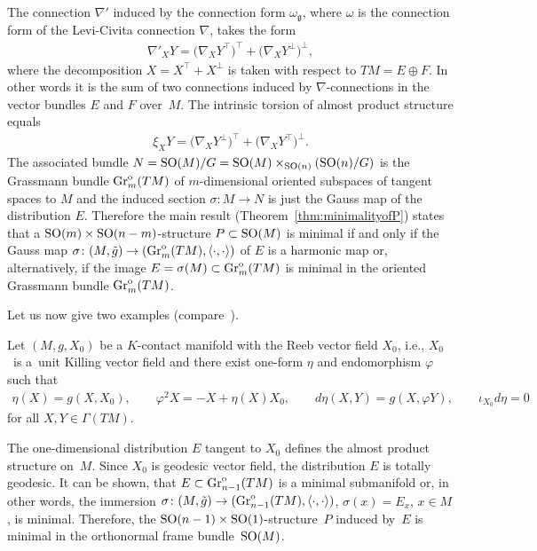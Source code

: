 \documentclass[10pt,a4paper]{amsart}
\numberwithin{equation}{section}
\newcommand{\skal}[2]{\langle #1,#2\rangle}
\begin{document}
The connection $\nabla'$ induced by the connection form $\omega_{\mathfrak{g}}$, where $\omega$ is the connection form of the Levi-Civita connection $\nabla$, takes the form
\begin{gather*}
\nabla '_XY=\big(\nabla_XY^{\top}\big)^{\top}+\big(\nabla_XY^{\bot}\big)^{\bot},
\end{gather*}
where the decomposition $X=X^{\top}+X^{\bot}$ is taken with respect to $TM=E\oplus F$. In other words it is the sum of two connections induced by $\nabla$-connections in the vector bundles $E$ and $F$ over~$M$. The intrinsic torsion of almost product structure equals
\begin{gather*}
\xi_XY=\big(\nabla_XY^{\bot}\big)^{\top}+\big(\nabla_XY^{\top}\big)^{\bot}.
\end{gather*}
The associated bundle $N={\rm SO}(M)/G={\rm SO}(M)\times_{{\rm SO}(n)}({\rm SO}(n)/G)$ is the Grassmann bundle $\operatorname{Gr}^{\rm o}_m(TM)$ of $m$-dimensional oriented subspaces of tangent spaces to $M$ and the induced section $\sigma\colon M\to N$ is just the Gauss map of the distribution $E$. Therefore the main result (Theorem~\ref{thm:minimalityofP}) states that a ${\rm SO}(m)\times {\rm SO}(n-m)$-structure $P\subset {\rm SO}(M)$ is minimal if and only if the Gauss map $\sigma\colon (M,\tilde{g})\to (\operatorname{Gr}^{\rm o}_m(TM),\skal{\cdot}{\cdot})$ of $E$ is a harmonic map or, alternatively, if the image $E=\sigma(M)\subset \operatorname{Gr}^{\rm o}_m(TM)$ is minimal in the oriented Grassmann bundle $\operatorname{Gr}^{\rm o}_m(TM)$.

Let us now give two examples (compare~\cite{ggv,gd,hl}).

\begin{Example}
Let $(M,g,X_0)$ be a $K$-contact manifold with the Reeb vector f\/ield $X_0$, i.e., $X_0$~is a~unit Killing vector f\/ield and there exist one-form $\eta$ and endomorphism $\varphi$ such that
\begin{gather*}
\eta(X)=g(X,X_0),\qquad \varphi^2X=-X+\eta(X)X_0,\qquad d\eta(X,Y)=g(X,\varphi Y),\qquad \iota_{X_0}d\eta=0
\end{gather*}
for all $X,Y\in\Gamma(TM)$.

The one-dimensional distribution $E$ tangent to $X_0$ def\/ines the almost product structure on~$M$. Since $X_0$ is geodesic vector f\/ield, the distribution $E$ is totally geodesic. It can be shown, that $E\subset \operatorname{Gr}^{\rm o}_{n-1}(TM)$ is a minimal submanifold or, in other words, the immersion $\sigma\colon (M,\tilde{g})\to (\operatorname{Gr}^{\rm o}_{n-1}(TM),\skal{\cdot}{\cdot})$, $\sigma(x)=E_x$, $x\in M$, is minimal. Therefore, the ${\rm SO}(n-1)\times {\rm SO}(1)$-structure~$P$ induced by~$E$ is minimal in the orthonormal frame bundle~${\rm SO}(M)$.
\end{Example}
\end{document}
